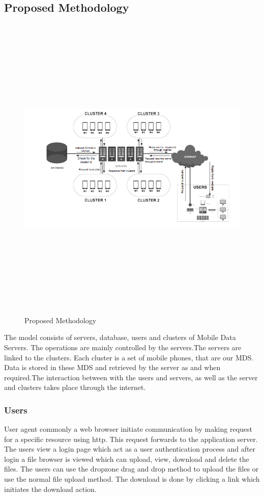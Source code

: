\documentclass[12pt, a4paper]{article}
\begin{document}
\subsection{Proposed Methodology}\vspace{5mm}
\begin{figure}[ht!]
    \centering
    \includegraphics[width=18cm,height=15cm,keepaspectratio]{proposed.png}
     \caption{Proposed Methodology}
    \label{fig:Proposed Methodology}
\end{figure}
The model consists of servers, database, users and clusters of Mobile Data Servers. The operations are mainly controlled by the servers.The servers are linked to the clusters. Each cluster is a set of mobile phones, that are our MDS. Data is stored in these MDS and retrieved by the server as and when required.The interaction between with the users and servers, as well as the server and clusters takes place through the internet.\\

\subsubsection{Users}
User agent commonly a web browser initiate communication by making request for a specific resource using http. This request forwards to the application server. The users view a login page which act as a user authentication process and after login a file browser is viewed which can upload, view, download and delete the files. The  users can use the dropzone drag and drop method to upload the files or use the normal file upload method. The download is done by clicking a link which initiates the download action.  
\end{document}
